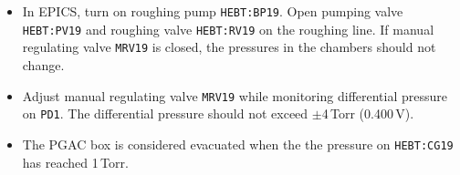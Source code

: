 \begin{itemize}
\item In EPICS, turn on roughing pump \texttt{HEBT:BP19}. Open pumping valve \texttt{HEBT:PV19} and roughing valve \texttt{HEBT:RV19} on the roughing line. If manual regulating valve \texttt{MRV19} is closed, the pressures in the chambers should not change.
\item Adjust manual regulating valve \texttt{MRV19}  while monitoring differential pressure on \texttt{PD1}.  The differential pressure should not exceed $\pm$4\,Torr (0.400\,V).
\item The PGAC box is considered evacuated when the the pressure on \texttt{HEBT:CG19} has reached 1\,Torr.%
\end{itemize}


